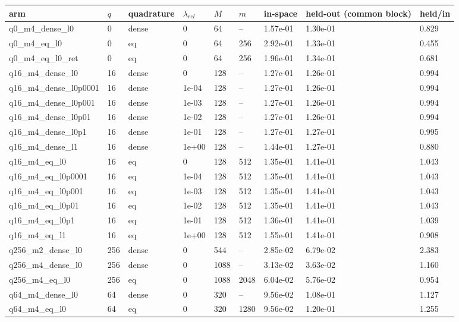 \documentclass[11pt]{article}
\begin{document}
\begin{table}[htbp]\centering\small
\begin{tabular}{lllllllll}\hline
arm & $q$ & quadrature & $\lambda_{rel}$ & $M$ & $m$ & in-space & held-out (common block) & held/in \\ \hline
q0\_m4\_dense\_l0 & 0 & dense & 0 & 64 & -- & 1.57e-01 & 1.30e-01 & 0.829 \\
q0\_m4\_eq\_l0 & 0 & eq & 0 & 64 & 256 & 2.92e-01 & 1.33e-01 & 0.455 \\
q0\_m4\_eq\_l0\_ret & 0 & eq & 0 & 64 & 256 & 1.96e-01 & 1.34e-01 & 0.681 \\
q16\_m4\_dense\_l0 & 16 & dense & 0 & 128 & -- & 1.27e-01 & 1.26e-01 & 0.994 \\
q16\_m4\_dense\_l0p0001 & 16 & dense & 1e-04 & 128 & -- & 1.27e-01 & 1.26e-01 & 0.994 \\
q16\_m4\_dense\_l0p001 & 16 & dense & 1e-03 & 128 & -- & 1.27e-01 & 1.26e-01 & 0.994 \\
q16\_m4\_dense\_l0p01 & 16 & dense & 1e-02 & 128 & -- & 1.27e-01 & 1.26e-01 & 0.994 \\
q16\_m4\_dense\_l0p1 & 16 & dense & 1e-01 & 128 & -- & 1.27e-01 & 1.27e-01 & 0.995 \\
q16\_m4\_dense\_l1 & 16 & dense & 1e+00 & 128 & -- & 1.44e-01 & 1.27e-01 & 0.880 \\
q16\_m4\_eq\_l0 & 16 & eq & 0 & 128 & 512 & 1.35e-01 & 1.41e-01 & 1.043 \\
q16\_m4\_eq\_l0p0001 & 16 & eq & 1e-04 & 128 & 512 & 1.35e-01 & 1.41e-01 & 1.043 \\
q16\_m4\_eq\_l0p001 & 16 & eq & 1e-03 & 128 & 512 & 1.35e-01 & 1.41e-01 & 1.043 \\
q16\_m4\_eq\_l0p01 & 16 & eq & 1e-02 & 128 & 512 & 1.35e-01 & 1.41e-01 & 1.043 \\
q16\_m4\_eq\_l0p1 & 16 & eq & 1e-01 & 128 & 512 & 1.36e-01 & 1.41e-01 & 1.039 \\
q16\_m4\_eq\_l1 & 16 & eq & 1e+00 & 128 & 512 & 1.55e-01 & 1.41e-01 & 0.908 \\
q256\_m2\_dense\_l0 & 256 & dense & 0 & 544 & -- & 2.85e-02 & 6.79e-02 & 2.383 \\
q256\_m4\_dense\_l0 & 256 & dense & 0 & 1088 & -- & 3.13e-02 & 3.63e-02 & 1.160 \\
q256\_m4\_eq\_l0 & 256 & eq & 0 & 1088 & 2048 & 6.04e-02 & 5.76e-02 & 0.954 \\
q64\_m4\_dense\_l0 & 64 & dense & 0 & 320 & -- & 9.56e-02 & 1.08e-01 & 1.127 \\
q64\_m4\_eq\_l0 & 64 & eq & 0 & 320 & 1280 & 9.56e-02 & 1.20e-01 & 1.255 \\
\hline\end{tabular}
\end{table}
\end{document}
